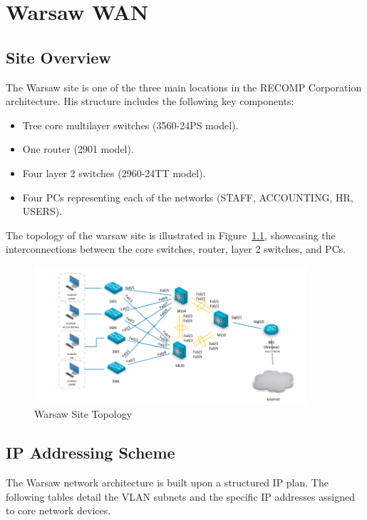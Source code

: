 \chapter{Warsaw WAN}

\section{Site Overview}
The Warsaw site is one of the three main locations in the \ac{RECOMP} Corporation architecture. His structure includes the following key components:
\begin{itemize}
    \item Tree core multilayer switches (3560-24PS model).
    \item One router (2901 model).
    \item Four layer 2 switches (2960-24TT model).
    \item  Four PCs representing each of the networks (STAFF, ACCOUNTING, HR, USERS).
    \end{itemize}


The topology of the warsaw site is illustrated in Figure~\ref{fig:warsaw-topology}, showcasing the interconnections between the core switches, router, layer 2 switches, and PCs.

\begin{figure}[h!]
    \centering
    \includegraphics[width=0.9\textwidth]{figures/warsaw-topology.png}
    \caption{Warsaw Site Topology}
    \label{fig:warsaw-topology}
\end{figure}



\section{IP Addressing Scheme}
The Warsaw network architecture is built upon a structured IP plan. The following tables detail the VLAN subnets and the specific IP addresses assigned to core network devices.

